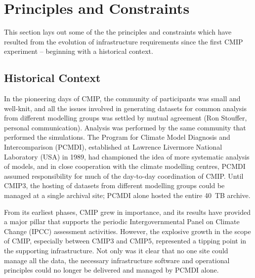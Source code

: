 \documentclass[gmd,manuscript]{copernicus}
\begin{document}
\section{Principles and Constraints}
\label{sec:principles}

This section lays out some of the the principles and constraints which
have resulted from the evolution of infrastructure requirements since
the first CMIP experiment -- beginning with a historical context.

\subsection{Historical Context}
\label{sec:history}

In the pioneering days of CMIP, the community of participants was
small and well-knit, and all the issues involved in generating
datasets for common analysis from different modelling groups was
settled by mutual agreement (Ron Stouffer, personal communication).
Analysis was performed by the same community that performed the
simulations. The Program for Climate Model Diagnosis and
Intercomparison (PCMDI), established at Lawrence Livermore National
Laboratory (USA) in 1989, had championed the idea
of more systematic analysis of models, and in close cooperation with
the climate modelling centres, PCMDI assumed responsibility for much of
the day-to-day coordination of CMIP. Until CMIP3, the hosting of
datasets from different modelling groups could be managed at a single
archival site; PCMDI alone hosted the entire 40~TB archive.

From its earliest phases, CMIP grew in importance, and its results have
provided a major pillar that supports the periodic Intergovernmental
Panel on Climate Change (IPCC) assessment activities. However, the
explosive growth in the scope of CMIP, especially between CMIP3 and
CMIP5, represented a tipping point in the supporting infrastructure.
Not only was it clear that no one site could manage all the data, the
necessary infrastructure software and operational principles could no
longer be delivered and managed by PCMDI alone.
\end{document}
